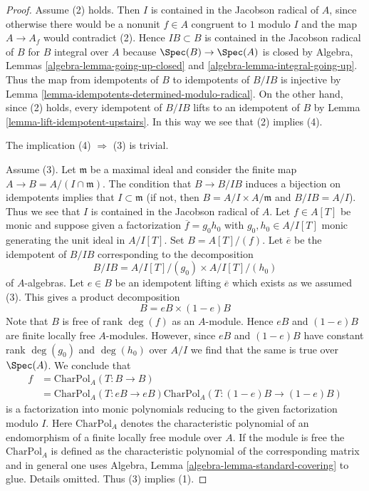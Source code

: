 \begin{proof}
Assume (2) holds. Then $I$ is contained in the Jacobson radical of $A$, since
otherwise there would be a nonunit $f \in A$ congruent to $1$ modulo $I$
and the map $A \to A_f$ would contradict (2). Hence $IB \subset B$
is contained in the Jacobson radical of $B$ for $B$ integral over $A$
because $\Spec(B) \to \Spec(A)$ is closed by
Algebra, Lemmas \ref{algebra-lemma-going-up-closed} and
\ref{algebra-lemma-integral-going-up}.
Thus the map from idempotents of $B$ to idempotents of $B/IB$
is injective by Lemma \ref{lemma-idempotents-determined-modulo-radical}.
On the other hand, since (2) holds, every idempotent
of $B/IB$ lifts to an idempotent of $B$
by Lemma \ref{lemma-lift-idempotent-upstairs}.
In this way we see that (2) implies (4).

\medskip\noindent
The implication (4) $\Rightarrow$ (3) is trivial.

\medskip\noindent
Assume (3). Let $\mathfrak m$ be a maximal ideal and consider the
finite map $A \to B = A/(I \cap \mathfrak m)$. The condition that
$B \to B/IB$ induces a bijection on idempotents implies that
$I \subset \mathfrak m$ (if not, then $B = A/I \times A/\mathfrak m$
and $B/IB = A/I$). Thus we see that $I$ is contained in the Jacobson
radical of $A$. Let $f \in A[T]$ be monic and suppose given a
factorization $\overline{f} = g_0h_0$ with $g_0, h_0 \in A/I[T]$ monic
generating the unit ideal in $A/I[T]$.
Set $B = A[T]/(f)$. Let $\overline{e}$ be the idempotent
of $B/IB$ corresponding to the decomposition
$$
B/IB = A/I[T]/(g_0) \times A/I[T]/(h_0)
$$
of $A$-algebras. Let $e \in B$ be an idempotent lifting $\overline{e}$
which exists as we assumed (3). This gives a product decomposition
$$
B = eB \times (1 - e)B
$$
Note that $B$ is free of rank $\deg(f)$ as an $A$-module.
Hence $eB$ and $(1 - e)B$ are finite locally free $A$-modules.
However, since $eB$ and $(1 - e)B$ have constant rank
$\deg(g_0)$ and $\deg(h_0)$ over $A/I$ we find that the same
is true over $\Spec(A)$. We conclude that
\begin{align*}
f & = \text{CharPol}_A(T : B \to B) \\
& =
\text{CharPol}_A(T : eB \to eB)
\text{CharPol}_A(T : (1 - e)B \to (1 - e)B)
\end{align*}
is a factorization into monic polynomials reducing to the given
factorization modulo $I$. Here $\text{CharPol}_A$ denotes the characteristic
polynomial of an endomorphism of a finite locally free module over $A$.
If the module is free the $\text{CharPol}_A$ is defined as the
characteristic polynomial of the corresponding matrix and in
general one uses Algebra, Lemma \ref{algebra-lemma-standard-covering} to
glue. Details omitted. Thus (3) implies (1).


\end{proof}
